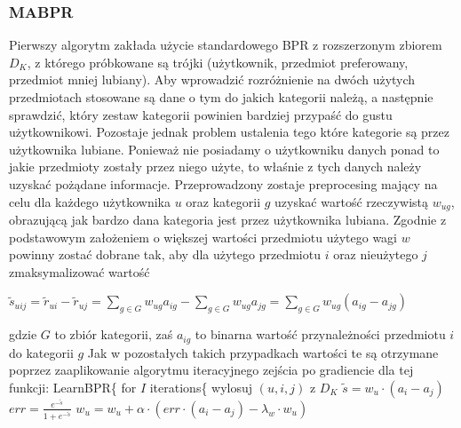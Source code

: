 \documentclass{pracamgr}
\begin{document}
    \subsubsection{MABPR}
     Pierwszy algorytm zakłada użycie standardowego BPR z rozszerzonym zbiorem $D_K$, z którego próbkowane są trójki
     (użytkownik, przedmiot preferowany, przedmiot mniej lubiany).
     Aby wprowadzić rozróżnienie na dwóch użytych przedmiotach stosowane są dane o tym do jakich kategorii należą,
     a następnie sprawdzić, który zestaw kategorii powinien bardziej przypaść do gustu użytkownikowi.
     Pozostaje jednak problem ustalenia tego które kategorie są przez użytkownika lubiane.
     Ponieważ nie posiadamy o użytkowniku danych ponad to jakie przedmioty zostały przez niego użyte, to właśnie z tych danych należy uzyskać
     pożądane informacje.
     Przeprowadzony zostaje preprocesing mający na celu dla każdego użytkownika $u$ oraz kategorii $g$ uzyskać
     wartość rzeczywistą $w_{ug}$, obrazującą jak bardzo dana kategoria jest przez użytkownika lubiana.
     Zgodnie z podstawowym założeniem o większej wartości przedmiotu użytego wagi $w$ powinny zostać dobrane tak,
     aby dla użytego przedmiotu $i$ oraz nieużytego $j$ zmaksymalizować wartość
     \begin{center}
      $\tilde{s}_{uij}=\tilde{r}_{ui}-\tilde{r}_{uj}=\sum_{g\in G}w_{ug}a_{ig}-\sum_{g\in G}w_{ug}a_{jg}=\sum_{g\in G}w_{ug}(a_{ig}-a_{jg})$
     \end{center}
     {\scriptsize
      gdzie $G$ to zbiór kategorii, zaś $a_{ig}$ to binarna wartość przynależności przedmiotu $i$ do kategorii $g$
     }\newline
     Jak w pozostałych takich przypadkach wartości te są otrzymane poprzez zaaplikowanie algorytmu iteracyjnego zejścia po gradiencie dla tej funkcji:\newline
     \hspace*{0pt} LearnBPR\{\newline
     \hspace*{16pt}	for $I$ iterations\{\newline
     \hspace*{32pt}		wylosuj $(u,i,j)$ z $D_K$\newline 
     \hspace*{32pt}		$\tilde{s}=w_u\cdot(a_i-a_j)$\newline
     \hspace*{32pt}		$err=\frac{e^{-\tilde{s}}}{1+e^{-\tilde{s}}}$\newline
     \hspace*{32pt}		$w_u=w_u+\alpha\cdot(err\cdot (a_i-a_j)-\lambda_w\cdot w_u)$\newline
\end{document}
